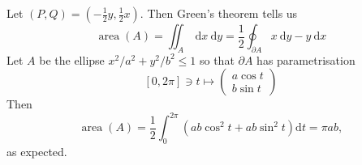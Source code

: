 \begin{example}
    Let $(P, Q)=\left(-\frac{1}{2} y, \frac{1}{2} x\right) .$ Then Green's theorem tells us
    \[
    \operatorname{area}(A)=\iint_{A} \mathrm{~d} x \mathrm{~d} y=\frac{1}{2} \oint_{\partial A} x \mathrm{~d} y-y \mathrm{~d} x
    \]
    Let $A$ be the ellipse $x^{2} / a^{2}+y^{2} / b^{2} \leq 1$ so that $\partial A$ has parametrisation
    \[
    [0,2 \pi] \ni t \mapsto \begin{pmatrix}
        a \cos t \\
        b \sin t
    \end{pmatrix}
    \]
    Then
    \[
    \operatorname{area}(A)=\frac{1}{2} \int_{0}^{2 \pi}\left(a b \cos ^{2} t+a b \sin ^{2} t\right) \mathrm{d} t=\pi a b,
    \]
    as expected.
\end{example}

